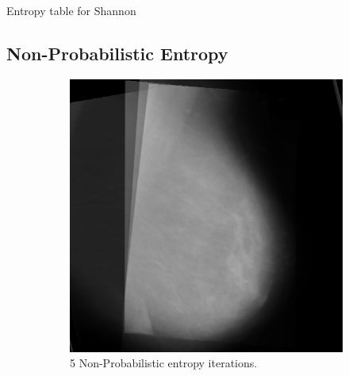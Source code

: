 \begin{table}
    \caption{Entropy table for Shannon}
    \label{table:shannon-entropy}
\end{table}

\newpage
\subsection{Non-Probabilistic Entropy}

\begin{figure}[H]
    \centering
    \begin{subfigure}[t]{0.3\textwidth}
        \includegraphics[width=\textwidth]{Chapter3/nonProb-img/nonProb-5.png}
        \caption{5 Non-Probabilistic entropy iterations.}
        \label{fig:5-nonProb}
    \end{subfigure} \hfill
    ~ %
    \begin{subfigure}[t]{0.3\textwidth}

\end{subfigure}
\end{figure}
